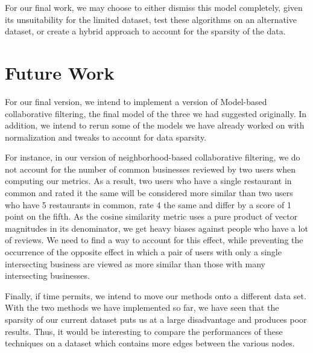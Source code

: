 \documentclass[10pt, letterpaper]{article}
\begin{document}
For our final work, we may choose to either dismiss this model completely,
given its unsuitability for the limited dataset, test these algorithms on
an alternative dataset, or create a hybrid approach to account for the
sparsity of the data.

\section{Future Work}

For our final version, we intend to implement a version of Model-based
collaborative filtering, the final model of the three we had suggested
originally. In addition, we intend to rerun some of the models we have
already worked on with normalization and tweaks to account for data
sparsity.

For instance, in our version of neighborhood-based collaborative
filtering, we do not account for the number of common businesses reviewed
by two users when computing our metrics. As a result, two users who have a
single restaurant in common and rated it the same will be considered more
similar than two users who have 5 restaurants in common, rate 4 the same
and differ by a score of 1 point on the fifth. As the cosine similarity
metric uses a pure product of vector magnitudes in its denominator, we get
heavy biases against people who have a lot of reviews. We need to
find a way to account for this effect, while preventing the occurrence of
the opposite effect in which a pair of users with only a single
intersecting business are viewed as more similar than those with many
intersecting businesses.

Finally, if time permits, we intend to move our methods onto a different
data set. With the two methods we have implemented so far, we have seen
that the sparsity of our current dataset puts us at a large disadvantage
and produces poor results. Thus, it would be interesting to compare the
performances of these techniques on a dataset which contains more edges
between the various nodes.
\end{document}
